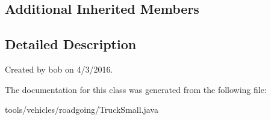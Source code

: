 \subsection*{Additional Inherited Members}


\subsection{Detailed Description}
Created by bob on 4/3/2016. 

The documentation for this class was generated from the following file\+:\begin{DoxyCompactItemize}
\item 
tools/vehicles/roadgoing/Truck\+Small.\+java\end{DoxyCompactItemize}
